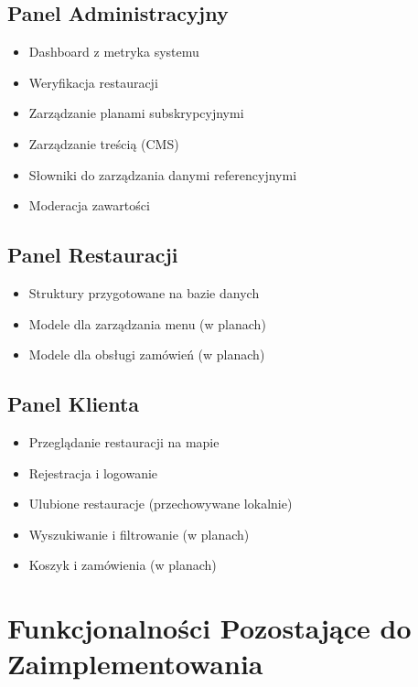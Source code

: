 \documentclass[12pt,a4paper,utf-8]{article}
\begin{document}
\subsection{Panel Administracyjny}

\begin{itemize}
    \item [OK] Dashboard z metryka systemu
    \item [OK] Weryfikacja restauracji
    \item [OK] Zarządzanie planami subskrypcyjnymi
    \item [OK] Zarządzanie treścią (CMS)
    \item [OK] Słowniki do zarządzania danymi referencyjnymi
    \item [OK] Moderacja zawartości
\end{itemize}

\subsection{Panel Restauracji}

\begin{itemize}
    \item Struktury przygotowane na bazie danych
    \item Modele dla zarządzania menu (w planach)
    \item Modele dla obsługi zamówień (w planach)
\end{itemize}

\subsection{Panel Klienta}

\begin{itemize}
    \item [OK] Przeglądanie restauracji na mapie
    \item [OK] Rejestracja i logowanie
    \item [OK] Ulubione restauracje (przechowywane lokalnie)
    \item Wyszukiwanie i filtrowanie (w planach)
    \item Koszyk i zamówienia (w planach)
\end{itemize}

\section{Funkcjonalności Pozostające do Zaimplementowania}
\end{document}
